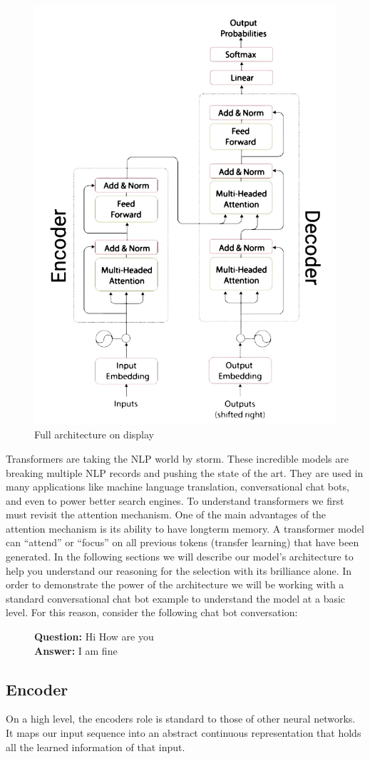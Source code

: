 \begin{figure}[H]
\centering
\includegraphics[width=.5\textwidth]{figures/t1.jpg}
\caption{Full architecture on display}
\end{figure}

Transformers are taking the NLP world by storm. These incredible models are breaking multiple NLP records and pushing the state of the art. They are used in many applications like machine language translation, conversational chat bots, and even to power better search engines. To understand transformers we first must revisit the attention mechanism. One of the main advantages of the attention mechanism is its ability to have longterm memory. A transformer model can “attend” or “focus” on all previous tokens (transfer learning) that have been generated. In the following sections we will describe our model's architecture to help you understand our reasoning for the selection with its brilliance alone. In order to demonstrate the power of the architecture we will be working with a standard conversational chat bot example to understand the model at a basic level. For this reason, consider the following chat bot conversation:

\begin{figure}[H]
\centering
\textbf{Question:} Hi How are you\\
\textbf{Answer:} I am fine
\end{figure}

\subsection{Encoder}
\noindent
On a high level, the encoders role is standard to those of other neural networks. It maps our input sequence into an abstract continuous representation that holds all the learned information of that input. \\

